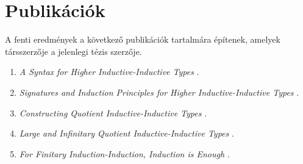 \documentclass[12pt]{article}
\begin{document}
\section{Publikációk}

A fenti eredmények a következő publikációk tartalmára építenek, amelyek
társszerzője a jelenlegi tézis szerzője.
\begin{enumerate}
  \item \emph{A Syntax for Higher Inductive-Inductive Types} \cite{hiit}.
  \item \emph{Signatures and Induction Principles for Higher Inductive-Inductive Types} \cite{hiits}.
  \item \emph{Constructing Quotient Inductive-Inductive Types} \cite{kaposi2019constructing}.
  \item \emph{Large and Infinitary Quotient Inductive-Inductive Types} \cite{iqiit}.
  \item \emph{For Finitary Induction-Induction, Induction is Enough} \cite{ind-ind-reduction}.
\end{enumerate}



\end{document}
